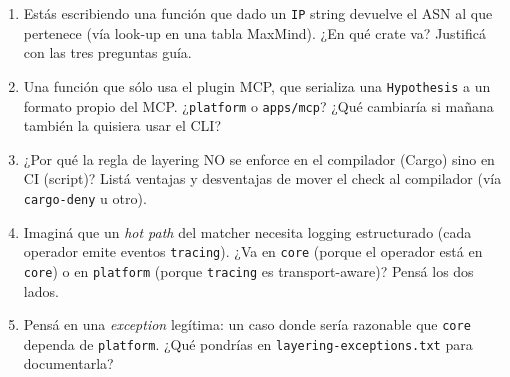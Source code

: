 \begin{ejercicios}
\begin{enumerate}
    \item \starred{} Estás escribiendo una función que dado un
    \texttt{IP} string devuelve el ASN al que pertenece (vía
    look-up en una tabla MaxMind). ¿En qué crate va? Justificá con
    las tres preguntas guía.

    \item Una función que sólo usa el plugin MCP, que serializa una
    \texttt{Hypothesis} a un formato propio del MCP. ¿\texttt{platform}
    o \texttt{apps/mcp}? ¿Qué cambiaría si mañana también la
    quisiera usar el CLI?

    \item ¿Por qué la regla de layering NO se enforce en el
    compilador (Cargo) sino en CI (script)? Listá ventajas y
    desventajas de mover el check al compilador (vía
    \texttt{cargo-deny} u otro).

    \item \starred{} Imaginá que un \emph{hot path} del matcher
    necesita logging estructurado (cada operador emite eventos
    \texttt{tracing}). ¿Va en \texttt{core} (porque el operador
    está en \texttt{core}) o en \texttt{platform} (porque
    \texttt{tracing} es transport-aware)? Pensá los dos lados.

    \item Pensá en una \emph{exception} legítima: un caso donde sería
    razonable que \texttt{core} dependa de \texttt{platform}.
    ¿Qué pondrías en \texttt{layering-exceptions.txt} para
    documentarla?
\end{enumerate}
\end{ejercicios}
